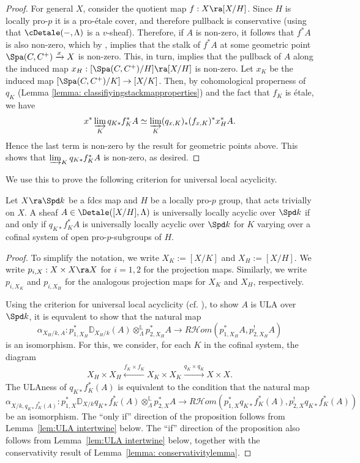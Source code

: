 \documentclass[letterpaper,11pt]{amsart}
\begin{document}
\begin{proof}
For general $X$, consider the quotient map $f: X \ra [X/H]$. Since $H$ is locally pro-$p$ it is a pro-\'etale cover, and therefore pullback is conservative (using that $\cDetale(-,\Lambda)$ is a $v$-sheaf). Therefore, if $A$ is non-zero, it follows that $f^{*}A$ is also non-zero, which by \cite[Proposition~14.3]{Ecod}, implies that the stalk of $f^{*}A$ at some geometric point $\Spa(C,C^{+}) \xrightarrow{x} X$ is non-zero. This, in turn, implies that the pullback of $A$ along the induced map $x_{H}: [\Spa(C,C^{+})/H] \ra [X/H]$ is non-zero. Let $x_K$ be the induced map $[\Spa(C,C^{+})/K]\to [X/K]$. Then, by cohomological properness of $q_K$ (Lemma \ref{lemma: classifiyingstackmapproperties}) and the fact that $f_{K}$ is \'etale, we have
\[ x^\ast\varinjlim_Kq_{K*}f_{K}^{*}A\simeq \varinjlim_K(q_{x,K})_\ast(f_{x,K})^\ast x_H^\ast A.\] 
Hence the last term is non-zero by the result for geometric points above. This shows that $\varinjlim_Kq_{K*}f_{K}^{*}A$ is non-zero, as desired.
\end{proof}

We use this to prove the following criterion for universal local acyclicity.
\begin{proposition}{\label{prop: ULA-Criterion}}
Let $X \ra \Spd k$ be a fdcs map and $H$ be a locally pro-$p$ group, that acts trivially on $X$. A sheaf $A \in \Detale([X/H],\Lambda)$ is universally locally acyclic over $\Spd k$ if and only if $q_{K*}f_{K}^{*}A$ is universally locally acyclic over $\Spd k$ for $K$ varying over a cofinal system of open pro-$p$-subgroups of $H$.
\end{proposition}
\begin{proof}
To simplify the notation, we write $X_{K} := [X/K]$ and $X_{H} := [X/H]$. We write $p_{i,X}: X \times X \ra X$ for $i = 1,2$ for the projection maps. Similarly, we write $p_{i,X_{K}}$ and $p_{i,X_{H}}$ for the analogous projection maps for $X_{K}$ and $X_{H}$, respectively.

Using the criterion \cite[Theorem IV.2.23(ii)]{FSGeomLLC} for universal local acyclicity (cf. \cite[Lemma 4.4.5]{HeyerMann}), to show $A$ is ULA over $\Spd k$, it is equvalent to show that the natural map
\[\alpha_{X_H/k,A}:p_{1,X_{H}}^\ast \mathbb{D}_{X_H/k}(A)\otimes^\mathbb{L}_\Lambda p_{2,X_{H}}^\ast A\rightarrow R\mathcal{H}om(p_{1,X_{H}}^\ast A, p_{2,X_{H}}^! A)\]
is an isomorphism. For this, we consider, for each $K$ in the cofinal system, the diagram
\begin{align*}
    X_H\times X_H \xleftarrow{f_K \times f_K} X_K \times X_K \xrightarrow{q_K \times q_K} X \times X.
\end{align*}
The ULAness of $q_{K*}f_{K}^{*}(A)$ is equivalent to the condition that the natural map
\[\alpha_{X/k,q_{K*}f_{K}^{*}(A)}:p_{1,X}^\ast \mathbb{D}_{X/k}q_{K*}f_{K}^{*}(A) \otimes^\mathbb{L}_\Lambda p_{2,X}^\ast A\rightarrow R\mathcal{H}om(p_{1,X}^*q_{K*}f_{K}^{*}(A), p_{2,X}^!q_{K*}f_{K}^{*}(A))\]
be an isomorphism. The ``only if'' direction of the proposition follows from Lemma~\ref{lem:ULA intertwine} below. The ``if'' direction of the proposition also follows from Lemma~\ref{lem:ULA intertwine} below, together with the conservativity result of Lemma~\ref{lemma: conservativitylemma}. 
\end{proof}
\end{document}
